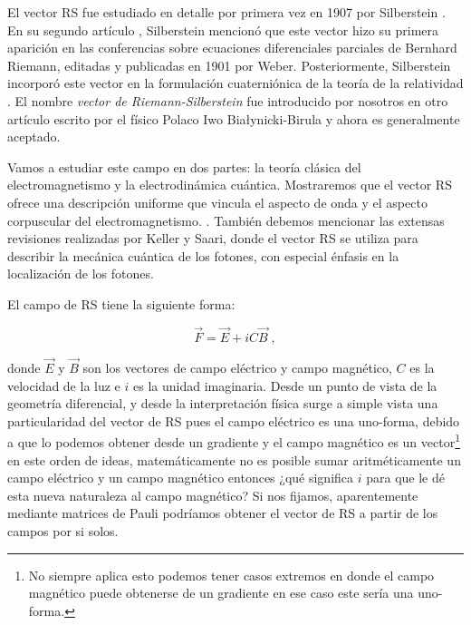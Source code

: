 El vector RS fue estudiado en detalle por primera vez en 1907 por Silberstein \cite{silberstein1907elektromagnetische}. En su segundo artículo \cite{silberstein1907nachtrag}, Silberstein mencionó que este vector hizo su primera aparición en las conferencias sobre ecuaciones diferenciales parciales de Bernhard Riemann, editadas y publicadas en 1901 por Weber. Posteriormente, Silberstein incorporó este vector en la formulación cuaterniónica de la teoría de la relatividad \cite{silberstein1912lxxvi}. El nombre \textit{vector de Riemann-Silberstein} fue introducido por nosotros en otro artículo escrito por el físico Polaco Iwo Białynicki-Birula y ahora es generalmente aceptado.

    Vamos a estudiar este campo en dos partes: la teoría clásica del electromagnetismo y la electrodinámica cuántica. Mostraremos que el vector RS ofrece una descripción uniforme que vincula el aspecto de onda y el aspecto corpuscular del electromagnetismo. . También debemos mencionar las extensas revisiones realizadas por Keller y Saari, donde el vector RS se utiliza para describir la mecánica cuántica de los fotones, con especial énfasis en la localización de los fotones.
    
    El campo de RS tiene la siguiente forma:

        \begin{equation}\label{eq:RSVector}
            \Vec{F} = \Vec{E} + iC\Vec{B}\;,
        \end{equation}

        donde $\Vec{E}$ y $\Vec{B}$ son los vectores de campo eléctrico y campo magnético, $C$ es la velocidad de la luz e $i$ es la unidad imaginaria. Desde un punto de vista de la geometría diferencial, y desde la interpretación física surge a simple vista una particularidad del vector de RS pues el campo eléctrico es una uno-forma, debido a que lo podemos obtener desde un gradiente y el campo magnético es un vector\footnote{No siempre aplica esto podemos tener casos extremos en donde el campo magnético puede obtenerse de un gradiente en ese caso este sería una uno-forma.} en este orden de ideas, matemáticamente no es posible sumar aritméticamente un campo eléctrico y un campo magnético entonces ¿qué significa $i$ para que le dé esta nueva naturaleza al campo magnético? Si nos fijamos, aparentemente mediante matrices de Pauli podríamos obtener el vector de RS a partir de los campos por si solos.\\

